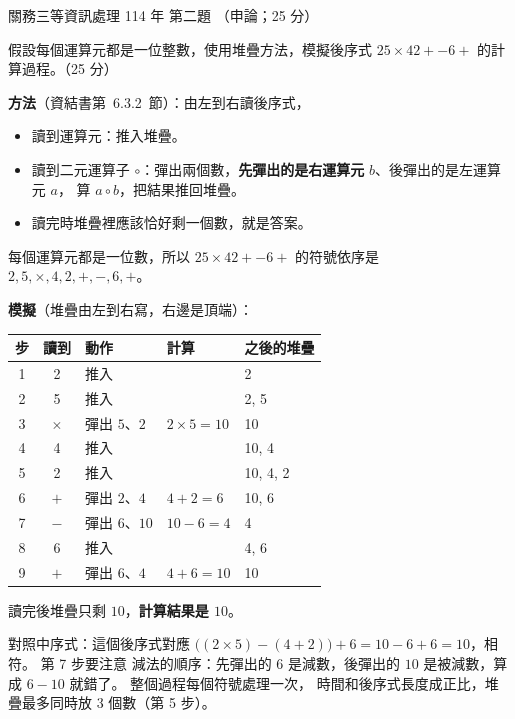 \begin{pastexam}[label={px:gw3-114-ds-02}]{關務三等資訊處理 114 年 第二題}
（申論；25 分）

假設每個運算元都是一位整數，使用堆疊方法，模擬後序式 $25{\times}42{+}{-}6{+}$ 的計算過程。（25 分）
\end{pastexam}

\begin{pastsoln}
\textbf{方法}（資結書第~6.3.2~節）：由左到右讀後序式，
\begin{itemize}[nosep]
\item 讀到運算元：推入堆疊。
\item 讀到二元運算子 $\circ$：彈出兩個數，\textbf{先彈出的是右運算元} $b$、後彈出的是左運算元 $a$，
算 $a \circ b$，把結果推回堆疊。
\item 讀完時堆疊裡應該恰好剩一個數，就是答案。
\end{itemize}
每個運算元都是一位數，所以 $25{\times}42{+}{-}6{+}$ 的符號依序是 $2, 5, \times, 4, 2, +, -, 6, +$。

\textbf{模擬}（堆疊由左到右寫，右邊是頂端）：
\begin{center}
\begin{tabular}{cclll}
\toprule
步 & 讀到 & 動作 & 計算 & 之後的堆疊 \\
\midrule
1 & 2 & 推入 & & 2 \\
2 & 5 & 推入 & & 2, 5 \\
3 & $\times$ & 彈出 $5$、$2$ & $2 \times 5 = 10$ & 10 \\
4 & 4 & 推入 & & 10, 4 \\
5 & 2 & 推入 & & 10, 4, 2 \\
6 & $+$ & 彈出 $2$、$4$ & $4 + 2 = 6$ & 10, 6 \\
7 & $-$ & 彈出 $6$、$10$ & $10 - 6 = 4$ & 4 \\
8 & 6 & 推入 & & 4, 6 \\
9 & $+$ & 彈出 $6$、$4$ & $4 + 6 = 10$ & 10 \\
\bottomrule
\end{tabular}
\end{center}
讀完後堆疊只剩 $10$，\textbf{計算結果是 $10$}。

對照中序式：這個後序式對應 $\bigl((2 \times 5) - (4 + 2)\bigr) + 6 = 10 - 6 + 6 = 10$，相符。 第 7 步要注意
減法的順序：先彈出的 $6$ 是減數，後彈出的 $10$ 是被減數，算成 $6 - 10$ 就錯了。 整個過程每個符號處理一次，
時間和後序式長度成正比，堆疊最多同時放 $3$ 個數（第 5 步）。
\end{pastsoln}
